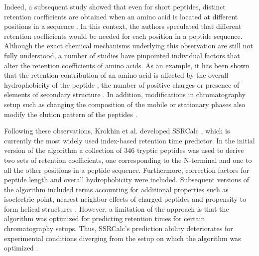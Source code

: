 \documentclass[a4paper]{article}
\begin{document}
Indeed, a subsequent study showed that even for short peptides,
distinct retention coefficients are obtained when an amino acid is
located at different positions in a sequence \cite{Houghten1987}. In
this context, the authors speculated that different retention
coefficients would be needed for each position in a peptide
sequence. Although the exact chemical mechanisms underlying this
observation are still not fully understood, a number of studies have
pinpointed individual factors that alter the retention coefficients of
amino acids. As an example, it has been shown that the retention
contribution of an amino acid is affected by the overall
hydrophobicity of the peptide \cite{Mant2006}, the number of positive
charges \cite{Mant2006} or presence of elements of secondary
structure \cite{Zhou1990}. In addition, modifications in
chromatography setup such as changing the composition of the mobile or
stationary phases also modify the elution pattern of the
peptides \cite{Browne1982, Guo1987, Gilar2010}.


Following these observations, Krokhin et al. developed
SSRCalc \cite{Krokhin2004}, which is currently the most widely used
index-based retention time predictor. In the initial version of the
algorithm a collection of 346 tryptic peptides was used to derive two
sets of retention coefficients, one corresponding to the N-terminal
and one to all the other positions in a peptide sequence. Furthermore,
correction factors for peptide length and overall hydrophobicity were
included. Subsequent versions of the algorithm included terms
accounting for additional properties such as isoelectric point,
nearest-neighbor effects of charged peptides and propensity to form
helical structures \cite{Krokhin2006}. However, a limitation of the
approach is that the algorithm was optimized for predicting retention
times for certain chromatography setups. Thus, SSRCalc's prediction
ability deteriorates for experimental conditions diverging from the
setup on which the algorithm was optimized \cite{Spicer2007}.

\end{document}
